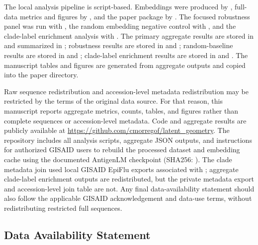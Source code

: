 \documentclass[11pt]{article}
\begin{document}
The local analysis pipeline is script-based. Embeddings were produced by , full-data metrics and figures by , and the paper package by . The focused robustness panel was run with , the random embedding negative control with , and the clade-label enrichment analysis with . The primary aggregate results are stored in  and summarized in ; robustness results are stored in  and ; random-baseline results are stored in  and ; clade-label enrichment results are stored in  and . The manuscript tables and figures are generated from aggregate outputs and copied into the paper directory.

Raw sequence redistribution and accession-level metadata redistribution may be restricted by the terms of the original data source. For that reason, this manuscript reports aggregate metrics, counts, tables, and figures rather than complete sequences or accession-level metadata. Code and aggregate results are publicly available at \url{https://github.com/cmorregof/latent_geometry}. The repository includes all analysis scripts, aggregate JSON outputs, and instructions for authorized GISAID users to rebuild the processed dataset and embedding cache using the documented AntigenLM checkpoint (SHA256: ). The clade metadata join used local GISAID EpiFlu exports associated with ; aggregate clade-label enrichment outputs are redistributed, but the private metadata export and accession-level join table are not. Any final data-availability statement should also follow the applicable GISAID acknowledgement and data-use terms, without redistributing restricted full sequences.

\subsection*{Data Availability Statement}
\end{document}
